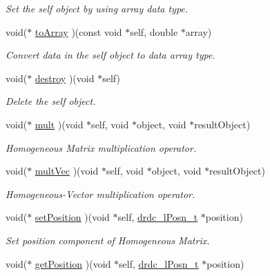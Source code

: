 \begin{CompactItemize}
\begin{CompactList}\small\item\em Set the self object by using array data type. \item\end{CompactList}\item 
void($\ast$ \hyperlink{structdrdc__HMatrix__t_7643f359a9607a1ea958c471726d1bd9}{toArray} )(const void $\ast$self, double $\ast$array)
\begin{CompactList}\small\item\em Convert data in the self object to data array type. \item\end{CompactList}\item 
void($\ast$ \hyperlink{structdrdc__HMatrix__t_9dc64b7353043c2f218a3c0b1ad6f7ad}{destroy} )(void $\ast$self)
\begin{CompactList}\small\item\em Delete the self object. \item\end{CompactList}\item 
void($\ast$ \hyperlink{structdrdc__HMatrix__t_79663fad7f7626be17eb5f0f5c3af8ce}{mult} )(void $\ast$self, void $\ast$object, void $\ast$resultObject)
\begin{CompactList}\small\item\em Homogeneous Matrix multiplication operator. \item\end{CompactList}\item 
void($\ast$ \hyperlink{structdrdc__HMatrix__t_15d90da71f6fcab0db9b585a8762cd30}{multVec} )(void $\ast$self, void $\ast$object, void $\ast$resultObject)
\begin{CompactList}\small\item\em Homogeneous-Vector multiplication operator. \item\end{CompactList}\item 
void($\ast$ \hyperlink{structdrdc__HMatrix__t_7dd237c5e42d0a48106bfd31bedeb99f}{setPosition} )(void $\ast$self, \hyperlink{structdrdc__lPosn__t}{drdc\_\-lPosn\_\-t} $\ast$position)
\begin{CompactList}\small\item\em Set position component of Homogeneous Matrix. \item\end{CompactList}\item 
void($\ast$ \hyperlink{structdrdc__HMatrix__t_432d1b20c6fc79da446a894988ad188e}{getPosition} )(void $\ast$self, \hyperlink{structdrdc__lPosn__t}{drdc\_\-lPosn\_\-t} $\ast$position)

\end{CompactItemize}
